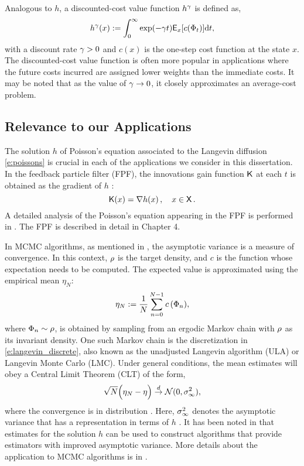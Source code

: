 Analogous to $h$, a discounted-cost value function $h^\gamma$ is defined as,
\begin{equation}
h^\discount(x) := \int_0^\infty \exp(-\discount t )\Expect_x[c(\markovstate_t)] \ud t, 
\label{e:discount_value_fn}
\end{equation}
with a discount rate $\gamma  >0$ and $c(x)$ is the one-step cost function at the state $x$. The discounted-cost value function is often more popular in applications where the future costs incurred are assigned lower weights than the immediate costs. It may be noted that as the value of $\gamma \to 0$, it closely approximates an average-cost problem. 

\subsection{Relevance to our Applications} 
The solution $h$ of Poisson's equation associated to the Langevin diffusion \eqref{e:poissons} is crucial in each of the applications we consider in this dissertation. In the feedback particle filter (FPF), the innovations gain function $\text{\sf K}$ at each $t$ is obtained as  the gradient of $h$ \cite{yanmehmey13}:
\begin{equation}
\kFPF (x) = \nabla h(x)\, ,  \quad x\in\state\, .
\label{e:fpfgain}
\end{equation}
A detailed analysis of the Poisson's equation appearing in the FPF is performed in \cite{laumehmeyrag15}. The FPF is described in detail in Chapter 4. %

In MCMC algorithms, as mentioned in , the asymptotic variance is a measure of convergence. In this context, $\rho$ is the target density, and $c$ is the function whose expectation needs to be computed. The expected value is approximated using the empirical mean $\eta_N$:
\begin{equation} \eta_N := \frac{1}{N} \sum_{n=0}^{N-1} c\,(\Phi_n),\end{equation}
where $\Phi_n \sim \rho$, is obtained by sampling from an ergodic Markov chain with $\rho$ as its invariant density. One such Markov chain is the discretization in \eqref{e:langevin_discrete}, also known as the unadjusted Langevin algorithm (ULA) or Langevin Monte Carlo (LMC). Under general conditions, the mean estimates will obey a Central Limit Theorem (CLT) of the form,
\begin{equation}
\sqrt{N} \Bigl( \eta_N - \eta \Bigr) \overset{d}{\to} \mathcal{N}(0,\sigma_\infty ^2),
\end{equation}
where the convergence is in distribution \cite{MT,bha82}. Here, $\sigma_\infty^2$ denotes the asymptotic variance that has a representation in terms of $h$ \cite{glymey96a,MT,asmgly07}. It has been noted in \cite{henthesis97, delkon12} that estimates for the solution $h$ can be used to construct algorithms that provide estimators with improved asymptotic variance. More details about the application to MCMC algorithms is in . 

